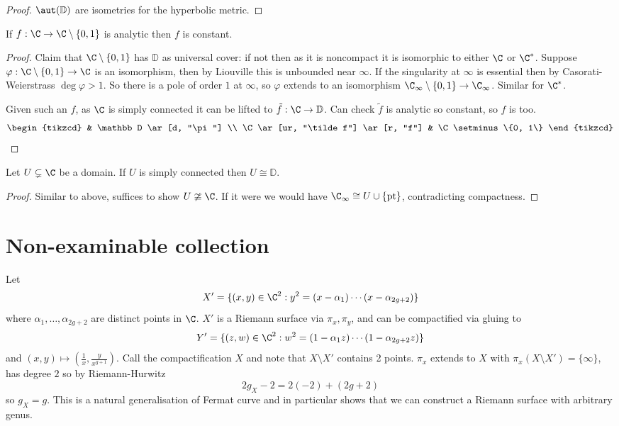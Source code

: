 \documentclass[a4paper]{article}
\begin{document}
\begin{proof}
  \(\aut(\mathbb D)\) are isometries for the hyperbolic metric.
\end{proof}

\begin{corollary}[Picard]
  If \(f: \C \to \C \setminus \{0, 1\}\) is analytic then \(f\) is constant.
\end{corollary}

\begin{proof}
  Claim that \(\C \setminus \{0, 1\}\) has \(\mathbb D\) as universal cover: if not then as it is noncompact it is isomorphic to either \(\C\) or \(\C^*\). Suppose \(\varphi: \C \setminus \{0, 1\} \to \C\) is an isomorphism, then by Liouville this is unbounded near \(\infty\). If the singularity at \(\infty\) is essential then by Casorati-Weierstrass \(\deg \varphi > 1\). So there is a pole of order \(1\) at \(\infty\), so \(\varphi\) extends to an isomorphism \(\C_\infty \setminus \{0, 1\} \to \C_\infty\). Similar for \(\C^*\).
  
  Given such an \(f\), as \(\C\) is simply connected it can be lifted to \(\tilde f: \C \to \mathbb D\). Can check \(\tilde f\) is analytic so constant, so \(f\) is too.
  \[
    \begin{tikzcd}
      & \mathbb D \ar[d, "\pi"] \\
      \C \ar[ur, "\tilde f"] \ar[r, "f"] & \C \setminus \{0, 1\}
    \end{tikzcd}
  \]
\end{proof}

\begin{corollary}
  Let \(U \subsetneq \C\) be a domain. If \(U\) is simply connected then \(U \cong \mathbb D\).
\end{corollary}

\begin{proof}
  Similar to above, suffices to show \(U \ncong \C\). If it were we would have \(\C_\infty \cong U \cup \{\text{pt}\}\), contradicting compactness.
\end{proof}

\section{Non-examinable collection}

Let
\[
  X' = \{(x, y) \in \C^2: y^2 = (x - \alpha_1) \cdots (x - \alpha_{2g + 2})\}
\]
where \(\alpha_1, \dots, \alpha_{2g + 2}\) are distinct points in \(\C\). \(X'\) is a Riemann surface via \(\pi_x, \pi_y\), and can be compactified via gluing to
\[
  Y' = \{(z, w) \in \C^2: w^2 = (1 - \alpha_1z) \cdots (1 - \alpha_{2g + 2} z)\}
\]
and \((x, y) \mapsto (\frac{1}{x}, \frac{y}{x^{g + 1}})\). Call the compactification \(X\) and note that \(X \setminus X'\) contains 2 points. \(\pi_x\) extends to \(X\) with \(\pi_x(X \setminus X') = \{\infty\}\), has degree \(2\) so by Riemann-Hurwitz
\[
  2g_X - 2 = 2(-2) + (2g + 2)
\]
so \(g_X = g\). This is a natural generalisation of Fermat curve and in particular shows that we can construct a Riemann surface with arbitrary genus.
\end{document}

